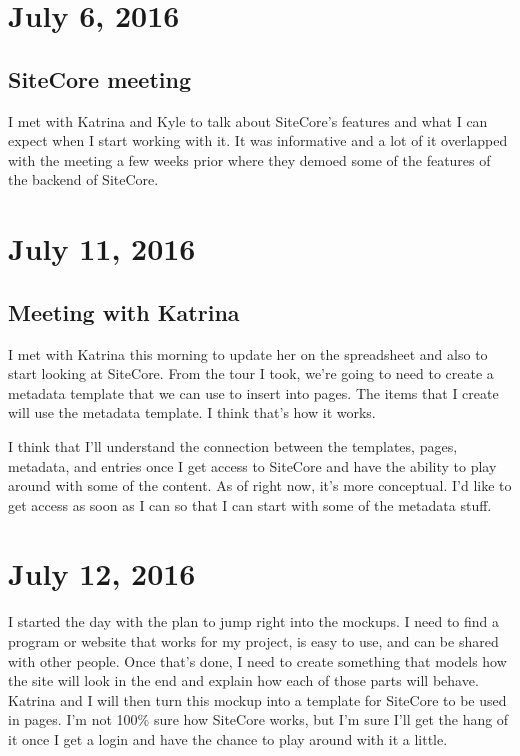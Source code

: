 \documentclass{article}
\begin{document}
\section{July 6, 2016}
\subsection{SiteCore meeting}
I met with Katrina and Kyle to talk about SiteCore's features and what I can expect when I start working with it. It was informative and a lot of it overlapped with the meeting a few weeks prior where they demoed some of the features of the backend of SiteCore.

\section{July 11, 2016}
\subsection{Meeting with Katrina}
I met with Katrina this morning to update her on the spreadsheet and also to start looking at SiteCore. From the tour I took, we're going to need to create a metadata template that we can use to insert into pages. The items that I create will use the metadata template. I think that's how it works.

I think that I'll understand the connection between the templates, pages, metadata, and entries once I get access to SiteCore and have the ability to play around with some of the content. As of right now, it's more conceptual. I'd like to get access as soon as I can so that I can start with some of the metadata stuff.

\section{July 12, 2016}
I started the day with the plan to jump right into the mockups. I need to find a program or website that works for my project, is easy to use, and can be shared with other people. Once that's done, I need to create something that models how the site will look in the end and explain how each of those parts will behave. Katrina and I will then turn this mockup into a template for SiteCore to be used in pages. I'm not 100\% sure how SiteCore works, but I'm sure I'll get the hang of it once I get a login and have the chance to play around with it a little.
\end{document}
